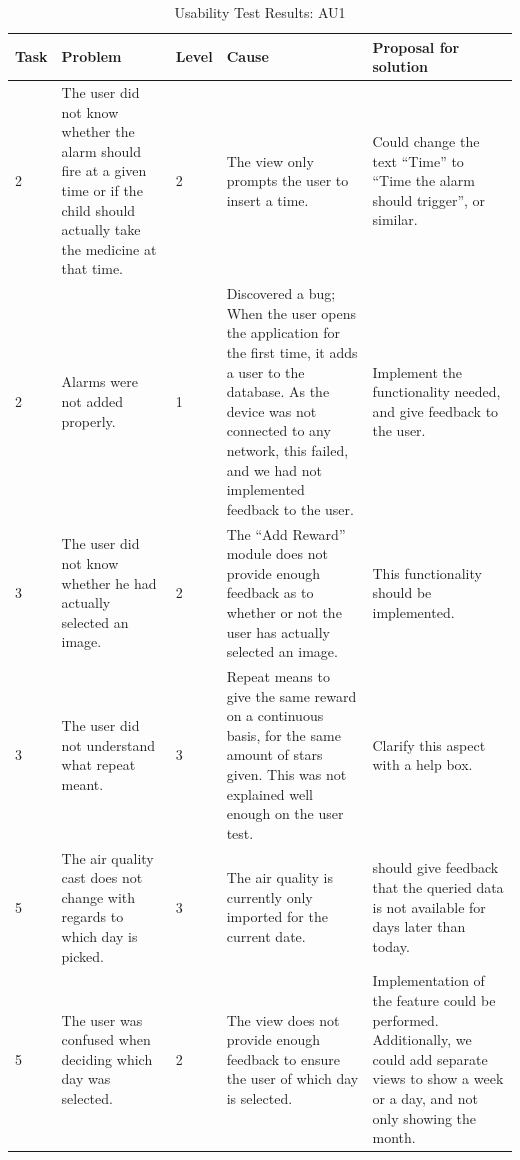 \begin{singlespacing}
\begin{table}[H]
\centering
\begin{tabular}{| p{0.8cm} | p{2.8cm} | p{0.9cm} | p{5.0cm} | p{3.1cm} |}
\hline
	\textbf{Task} & \textbf{Problem} & \textbf{Level} & \textbf{Cause} & \textbf{Proposal for solution} \\
	\hline
	2 & The user did not know whether the alarm should fire at a given time or if the child should actually take the medicine at that time. & 2 & The view only prompts the user to insert a time. & Could change the text ``Time'' to ``Time the alarm should trigger'', or similar. \\
	\hline
	2 & Alarms were not added properly. & 1 & Discovered a bug; When the user opens the application for the first time, it adds a user to the database. As the device was not connected to any network, this failed, and we had not implemented feedback to the user. & Implement the functionality needed, and give feedback to the user. \\
	\hline
	3 & The user did not know whether he had actually selected an image. & 2 & The ``Add Reward'' module does not provide enough feedback as to whether or not the user has actually selected an image. & This functionality should be implemented.  \\
	\hline
	3 & The user did not understand what repeat meant. & 3 & Repeat means to give the same reward on a continuous basis, for the same amount of stars given. This was not explained well enough on the user test. & Clarify this aspect with a help box.   \\
	\hline
	5 & The air quality cast does not change with regards to which day is picked. & 3 & The air quality is currently only imported for the current date. & \app{} should give feedback that the queried data is not available for days later than today. \\ 
	\hline
	5 & The user was confused when deciding which day was selected. & 2 & The view does not provide enough feedback to ensure the user of which day is selected. & Implementation of the feature could be performed. Additionally, we could add separate views to show a week or a day, and not only showing the month. \\
	\hline  
\end{tabular}
\caption{Usability Test Results: AU1}
\label{tab:testadult2}
\end{table}
\end{singlespacing}


